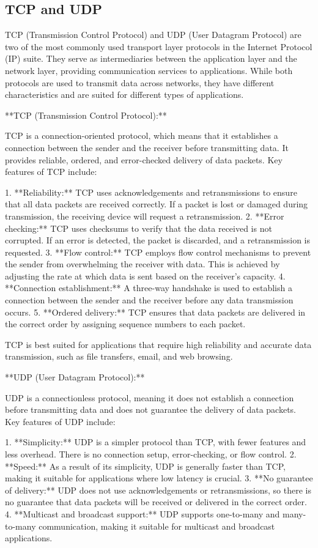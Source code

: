 \documentclass{article}
\begin{document}
\subsection{TCP and UDP}

TCP (Transmission Control Protocol) and UDP (User Datagram Protocol) are two of the most commonly used transport layer protocols in the Internet Protocol (IP) suite. They serve as intermediaries between the application layer and the network layer, providing communication services to applications. While both protocols are used to transmit data across networks, they have different characteristics and are suited for different types of applications.

**TCP (Transmission Control Protocol):**

TCP is a connection-oriented protocol, which means that it establishes a connection between the sender and the receiver before transmitting data. It provides reliable, ordered, and error-checked delivery of data packets. Key features of TCP include:

1. **Reliability:** TCP uses acknowledgements and retransmissions to ensure that all data packets are received correctly. If a packet is lost or damaged during transmission, the receiving device will request a retransmission.
2. **Error checking:** TCP uses checksums to verify that the data received is not corrupted. If an error is detected, the packet is discarded, and a retransmission is requested.
3. **Flow control:** TCP employs flow control mechanisms to prevent the sender from overwhelming the receiver with data. This is achieved by adjusting the rate at which data is sent based on the receiver's capacity.
4. **Connection establishment:** A three-way handshake is used to establish a connection between the sender and the receiver before any data transmission occurs.
5. **Ordered delivery:** TCP ensures that data packets are delivered in the correct order by assigning sequence numbers to each packet.

TCP is best suited for applications that require high reliability and accurate data transmission, such as file transfers, email, and web browsing.

**UDP (User Datagram Protocol):**

UDP is a connectionless protocol, meaning it does not establish a connection before transmitting data and does not guarantee the delivery of data packets. Key features of UDP include:

1. **Simplicity:** UDP is a simpler protocol than TCP, with fewer features and less overhead. There is no connection setup, error-checking, or flow control.
2. **Speed:** As a result of its simplicity, UDP is generally faster than TCP, making it suitable for applications where low latency is crucial.
3. **No guarantee of delivery:** UDP does not use acknowledgements or retransmissions, so there is no guarantee that data packets will be received or delivered in the correct order.
4. **Multicast and broadcast support:** UDP supports one-to-many and many-to-many communication, making it suitable for multicast and broadcast applications.
\end{document}
